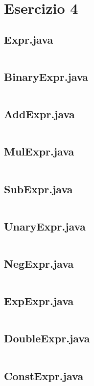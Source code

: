 \section*{Esercizio 4}

\subsection*{Expr.java}
\inputminted{java}{tex/src/4/Expr.java}

\subsection*{BinaryExpr.java}
\inputminted{java}{tex/src/4/BinaryExpr.java}

\subsection*{AddExpr.java}
\inputminted{java}{tex/src/4/AddExpr.java}

\subsection*{MulExpr.java}
\inputminted{java}{tex/src/4/MulExpr.java}

\subsection*{SubExpr.java}
\inputminted{java}{tex/src/4/SubExpr.java}

\subsection*{UnaryExpr.java}
\inputminted{java}{tex/src/4/UnaryExpr.java}

\subsection*{NegExpr.java}
\inputminted{java}{tex/src/4/NegExpr.java}

\subsection*{ExpExpr.java}
\inputminted{java}{tex/src/4/ExpExpr.java}

\subsection*{DoubleExpr.java}
\inputminted{java}{tex/src/DoubleExpr.java}

\subsection*{ConstExpr.java}
\inputminted{java}{tex/src/ConstExpr.java}
